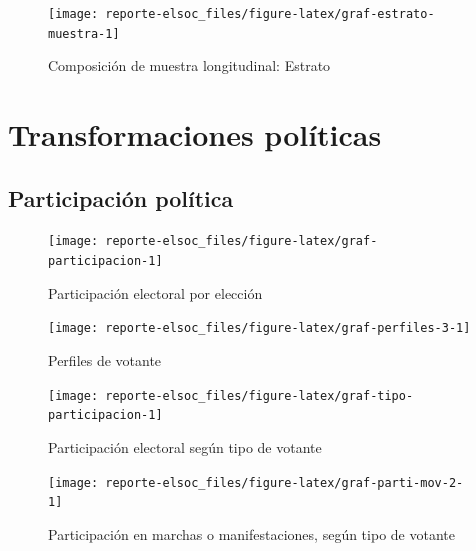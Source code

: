 \documentclass[
  12pt,
]{book}
\begin{document}
\begin{figure}

{\centering \texttt{[image: reporte-elsoc\_files/figure-latex/graf-estrato-muestra-1]} 

}

\caption{Composición de muestra longitudinal: Estrato}\label{fig:graf-estrato-muestra}
\end{figure}

\hypertarget{transformaciones-poluxedticas}{%
\chapter{Transformaciones políticas}\label{transformaciones-poluxedticas}}

\hypertarget{participaciuxf3n-poluxedtica}{%
\section{Participación política}\label{participaciuxf3n-poluxedtica}}

\begin{figure}

{\centering \texttt{[image: reporte-elsoc\_files/figure-latex/graf-participacion-1]} 

}

\caption{Participación electoral por elección}\label{fig:graf-participacion}
\end{figure}

\begin{figure}

{\centering \texttt{[image: reporte-elsoc\_files/figure-latex/graf-perfiles-3-1]} 

}

\caption{Perfiles de votante}\label{fig:graf-perfiles-3}
\end{figure}

\begin{figure}

{\centering \texttt{[image: reporte-elsoc\_files/figure-latex/graf-tipo-participacion-1]} 

}

\caption{Participación electoral según tipo de votante}\label{fig:graf-tipo-participacion}
\end{figure}

\begin{figure}

{\centering \texttt{[image: reporte-elsoc\_files/figure-latex/graf-parti-mov-2-1]} 

}

\caption{Participación en marchas o manifestaciones, según tipo de votante}\label{fig:graf-parti-mov-2}
\end{figure}
\end{document}
